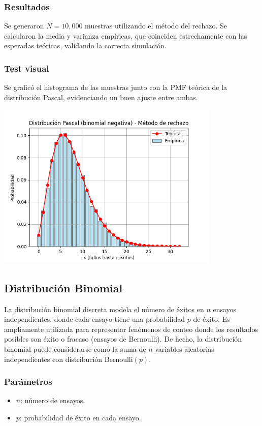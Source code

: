 \documentclass{article}
\begin{document}
\subsubsection{Resultados}

Se generaron $N=10{,}000$ muestras utilizando el método del rechazo. Se calcularon la media y varianza empíricas, que coinciden estrechamente con las esperadas teóricas, validando la correcta simulación.

\subsubsection{Test visual}

Se graficó el histograma de las muestras junto con la PMF teórica de la distribución Pascal, evidenciando un buen ajuste entre ambas.

\begin{center}
    \includegraphics[width=0.8\textwidth]{visualizaciones/pascal_rechazo.png}
\end{center}


\subsection{Distribución Binomial}

La distribución binomial discreta modela el número de éxitos en $n$ ensayos independientes, donde cada ensayo tiene una probabilidad $p$ de éxito. Es ampliamente utilizada para representar fenómenos de conteo donde los resultados posibles son éxito o fracaso (ensayos de Bernoulli). De hecho, la distribución binomial puede considerarse como la suma de $n$ variables aleatorias independientes con distribución Bernoulli$(p)$.

\subsubsection*{Parámetros}
\begin{itemize}
  \item $n$: número de ensayos.
  \item $p$: probabilidad de éxito en cada ensayo.
\end{itemize}
\end{document}
